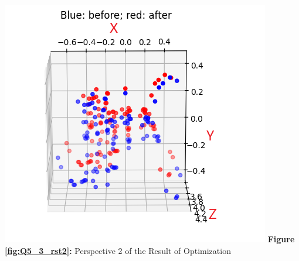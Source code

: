 \begin{your_solution}[title=Q5.3,height=21.5cm,width=\linewidth]
\begin{minipage}{0.5\linewidth}
	\includegraphics[width=1\linewidth, height=1\columnwidth]{../Q5_3_rst2.png}
	\textbf{Figure \ref{fig:Q5_3_rst2}:} Perspective 2 of the Result of Optimization
	\label{fig:Q5_3_rst2}         %
\end{minipage}
\newline
\newline


\end{your_solution}
